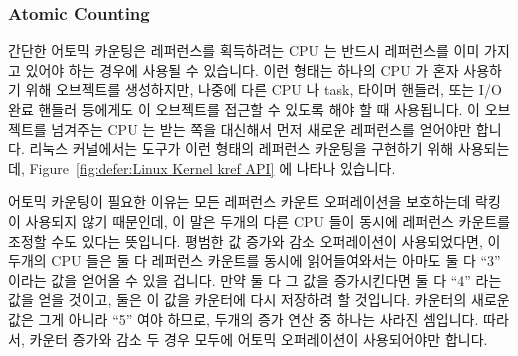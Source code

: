 \subsubsection{Atomic Counting}
\label{sec:defer:Atomic Counting}

간단한 어토믹 카운팅은 레퍼런스를 획득하려는 CPU 는 반드시 레퍼런스를 이미
가지고 있어야 하는 경우에 사용될 수 있습니다.
이런 형태는 하나의 CPU 가 혼자 사용하기 위해 오브젝트를 생성하지만, 나중에 다른
CPU 나 task, 타이머 핸들러, 또는 I/O 완료 핸들러 등에게도 이 오브젝트를 접근할
수 있도록 해야 할 때 사용됩니다.
이 오브젝트를 넘겨주는 CPU 는 받는 쪽을 대신해서 먼저 새로운 레퍼런스를
얻어야만 합니다.
리눅스 커널에서는  도구가 이런 형태의 레퍼런스 카운팅을 구현하기 위해
사용되는데,
Figure~\ref{fig:defer:Linux Kernel kref API} 에 나타나 있습니다.
\iffalse

Simple atomic counting may be used in cases where any CPU acquiring
a reference must already hold a reference.
This style is used when a single CPU creates an object for its
own private use, but must allow other CPU, tasks, timer handlers,
or I/O completion handlers that it later spawns to also access this object.
Any CPU that hands the object off must first acquire a new reference
on behalf of the recipient object.
In the Linux kernel, the \co{kref} primitives are used to implement
this style of reference counting, as shown in
Figure~\ref{fig:defer:Linux Kernel kref API}.
\fi

어토믹 카운팅이 필요한 이유는 모든 레퍼런스 카운트 오퍼레이션을 보호하는데
락킹이 사용되지 않기 때문인데, 이 말은 두개의 다른 CPU 들이 동시에 레퍼런스
카운트를 조정할 수도 있다는 뜻입니다.
평범한 값 증가와 감소 오퍼레이션이 사용되었다면, 이 두개의 CPU 들은 둘 다
레퍼런스 카운트를 동시에 읽어들여와서는 아마도 둘 다 ``3'' 이라는 값을 얻어올
수 있을 겁니다.
만약 둘 다 그 값을 증가시킨다면 둘 다 ``4'' 라는 값을 얻을 것이고, 둘은 이 값을
카운터에 다시 저장하려 할 것입니다.
카운터의 새로운 값은 그게 아니라 ``5'' 여야 하므로, 두개의 증가 연산 중 하나는
사라진 셈입니다.
따라서, 카운터 증가와 감소 두 경우 모두에 어토믹 오퍼레이션이 사용되어야만
합니다.
\iffalse

Atomic counting is required
because locking is not used to protect all reference-count operations,
which means that it is possible for two different CPUs to concurrently
manipulate the reference count.
If normal increment and decrement were used, a pair of CPUs might both
fetch the reference count concurrently, perhaps both obtaining
the value ``3''.
If both of them increment their value, they will both obtain ``4'',
and both will store this value back into the counter.
Since the new value of the counter should instead be ``5'', one
of the two increments has been lost.
Therefore, atomic operations must be used both for counter increments
and for counter decrements.
\fi

